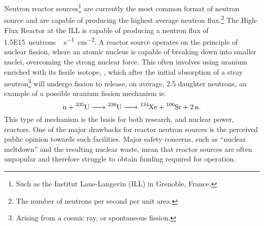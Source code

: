 Neutron reactor sources\footnote{Such as the Institut Laue-Langevin (ILL) in Grenoble, France.} are currently the most common format of neutron source and are capable of producing the highest average neutron flux.\footnote{The number of neutrons per second per unit area.}
The High-Flux Reactor at the ILL is capable of producing a neutron flux of \SI{1.5E15}{neutrons\,\second^{-1}\centi\meter^{-2}}.\autocite{noauthor_ill_nodate}
A reactor source operates on the principle of nuclear fission, where an atomic nucleus is capable of breaking down into smaller nuclei, overcoming the strong nuclear force. This often involves using uranium enriched with its fissile isotope, , which after the initial absorption of a stray neutron\footnote{Arising from a cosmic ray, or spontaneous fission.} will undergo fission to release, on average, 2.5 daughter neutrons, an example of a possible uranium fission mechanism is:
%
\begin{equation*}
    \ce{n + ^{235}U -> ^{236}U -> ^{134}Xe + ^{100}Sr + 2n}.
\end{equation*}
%
This type of mechanism is the basis for both research, and nuclear power, reactors.\autocite{sivia_elementary_2011}
One of the major drawbacks for reactor neutron sources is the perceived public opinion towards such facilities.
Major safety concerns, such as ``nuclear meltdown'' and the resulting nuclear waste, mean that reactor sources are often unpopular and therefore struggle to obtain funding required for operation.

